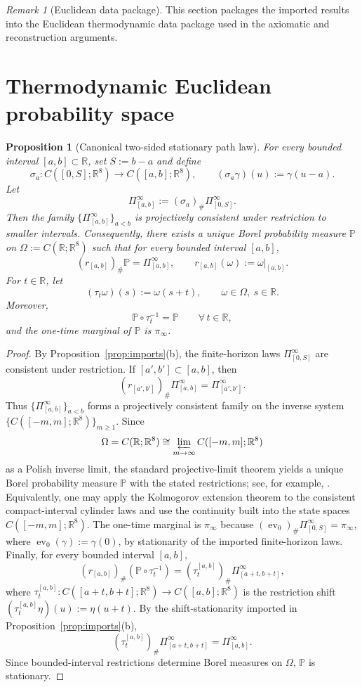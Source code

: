\documentclass[11pt]{article}
\newtheorem{proposition}[theorem]{Proposition}
\theoremstyle{definition}
\theoremstyle{remark}
\newtheorem{remark}[theorem]{Remark}
\newcommand{\R}{\mathbb R}
\begin{document}
\begin{remark}[Euclidean data package]
This section packages the imported results into the Euclidean thermodynamic data
package used in the axiomatic and reconstruction arguments.
\end{remark}

\section{Thermodynamic Euclidean probability space}

\begin{proposition}[Canonical two-sided stationary path law]
\label{prop:two-sided-extension}
For every bounded interval \([a,b]\subset\R\), set \(S:=b-a\) and define
\[
\sigma_a:C([0,S];\R^8)\to C([a,b];\R^8),
\qquad
(\sigma_a\gamma)(u):=\gamma(u-a).
\]
Let
\[
\Pi_{[a,b]}^\infty:=(\sigma_a)_\#\Pi_{[0,S]}^\infty.
\]
Then the family \(\{\Pi_{[a,b]}^\infty\}_{a<b}\) is projectively consistent under
restriction to smaller intervals.  Consequently, there exists a unique Borel
probability measure \(\mathbb P\) on \(\Omega:=C(\R;\R^8)\) such that for every
bounded interval \([a,b]\),
\[
(r_{[a,b]})_\#\mathbb P=\Pi_{[a,b]}^\infty,
\qquad
r_{[a,b]}(\omega):=\omega|_{[a,b]}.
\]
For \(t\in\R\), let
\[
(\tau_t\omega)(s):=\omega(s+t),
\qquad \omega\in\Omega,\ s\in\R.
\]
Moreover,
\[
\mathbb P\circ\tau_t^{-1}=\mathbb P
\qquad\forall\,t\in\R,
\]
and the one-time marginal of \(\mathbb P\) is \(\pi_\infty\).
\end{proposition}

\begin{proof}
By Proposition~\ref{prop:imports}\textnormal{(b)}, the finite-horizon laws
\(\Pi_{[0,S]}^\infty\) are consistent under restriction.  If
\([a',b']\subset[a,b]\), then
\[
(r_{[a',b']})_\#\Pi_{[a,b]}^\infty=\Pi_{[a',b']}^\infty.
\]
Thus \(\{\Pi_{[a,b]}^\infty\}_{a<b}\) forms a projectively consistent family on
the inverse system \(\{C([-m,m];\R^8)\}_{m\ge1}\). Since
\[
\Omega=C(\R;\R^8)\cong\varprojlim_{m\to\infty} C([-m,m];\R^8)
\]
as a Polish inverse limit, the standard projective-limit theorem yields a
unique Borel probability measure \(\mathbb P\) with the stated restrictions;
see, for example, \cite[Chapter~V]{parthasarathy1967}.  Equivalently, one may
apply the Kolmogorov extension theorem to the consistent compact-interval
cylinder laws and use the continuity built into the state spaces
\(C([-m,m];\R^8)\).
The one-time marginal is \(\pi_\infty\) because
\((\operatorname{ev}_0)_\#\Pi_{[0,S]}^\infty=\pi_\infty\), where
\(\operatorname{ev}_0(\gamma):=\gamma(0)\), by stationarity of the
imported finite-horizon laws.  Finally, for every bounded interval \([a,b]\),
\[
(r_{[a,b]})_\#(\mathbb P\circ\tau_t^{-1})
=
(\tau_t^{[a,b]})_\#\Pi_{[a+t,b+t]}^\infty,
\]
where \(\tau_t^{[a,b]}:C([a+t,b+t];\R^8)\to C([a,b];\R^8)\) is the restriction
shift \((\tau_t^{[a,b]}\eta)(u):=\eta(u+t)\). By the shift-stationarity imported
in Proposition~\ref{prop:imports}\textnormal{(b)},
\[
(\tau_t^{[a,b]})_\#\Pi_{[a+t,b+t]}^\infty=\Pi_{[a,b]}^\infty.
\]
Since bounded-interval restrictions determine Borel measures on \(\Omega\),
\(\mathbb P\) is stationary.
\end{proof}
\end{document}
